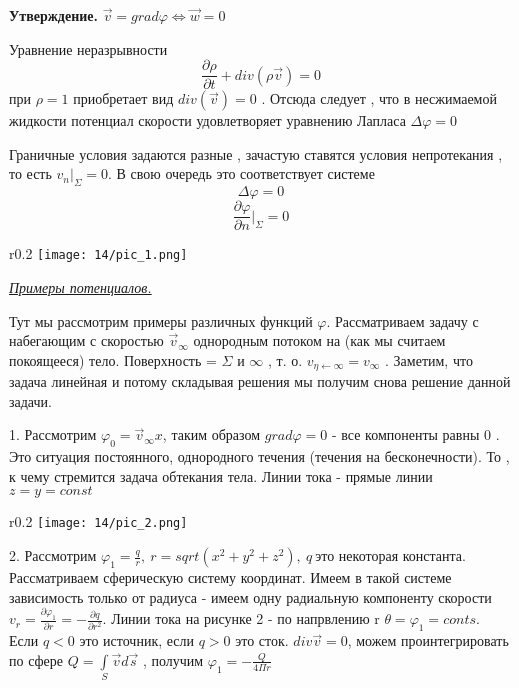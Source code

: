 \textbf{Утверждение.} $\overrightarrow{v} = grad \varphi \Leftrightarrow \overrightarrow{w} = 0$

\newpage
Уравнение неразрывности 
$$
\frac{\partial \rho}{\partial t} + div(\rho \overrightarrow{v}) = 0
$$
при $\rho = 1$  приобретает вид $div( \overrightarrow{v}) = 0 $ . Отсюда следует , что в несжимаемой жидкости потенциал скорости удовлетворяет уравнению Лапласа $\Delta \varphi = 0$

Граничные условия задаются разные , зачастую ставятся условия непротекания , то есть $v_n |_{\Sigma} = 0$. В свою очередь это соответствует системе 
$$
\Delta \varphi = 0
$$
$$
\frac{\partial \varphi}{\partial n} |_{\Sigma} = 0
$$

\begin{wrapfigure}{r}{0.2\textwidth}
	\texttt{[image: 14/pic\_1.png]}
	\caption{\label{ris:image14.1}}
\end{wrapfigure}

\begin{center}
	\textit{\underline{Примеры потенциалов.}}
\end{center}

Тут мы рассмотрим примеры различных функций $\varphi $. Рассматриваем задачу с набегающим с скоростью $\overrightarrow{v}_{\infty}$ однородным потоком на (как мы считаем покоящееся) тело.  Поверхность = $\Sigma$ и $\infty$  , т. о. $v_{\eta \leftarrow \infty} = v_\infty$ . Заметим, что задача линейная и потому складывая решения мы получим снова решение данной задачи.

1. Рассмотрим $\varphi_0 = \overrightarrow{v}_{\infty} x$, таким образом $grad \varphi = 0$ - все компоненты равны 0 . Это ситуация постоянного, однородного течения (течения на бесконечности). То , к чему стремится задача обтекания тела. Линии тока - прямые линии $z=y=const$

\begin{wrapfigure}{r}{0.2\textwidth}
	\texttt{[image: 14/pic\_2.png]}
	\caption{\label{ris:image14.2}}
\end{wrapfigure}

2. Рассмотрим $\varphi_1 = \frac{q}{r}, \ r = sqrt(x^2+y^2+z^2), \ q \ \text{это некоторая константа}$. Рассматриваем сферическую систему координат. Имеем в такой системе зависимость только от радиуса - имеем одну радиальную компоненту скорости $v_r = \frac {\partial \varphi_1 } {\partial r}= -\frac{\partial q}{\partial r^2}.$ Линии тока  на рисунке  2 - по напрвлению r $\theta = \varphi_1 = conts$. Если $q < 0$ это источник, если $q > 0$ это сток. $div \overrightarrow{v} = 0$, можем проинтегрировать по  сфере $Q = \int\limits_{S} \overrightarrow{v} d \overrightarrow{s} $ , получим $\varphi_1 =- \frac{Q}{4\Pi r}$

